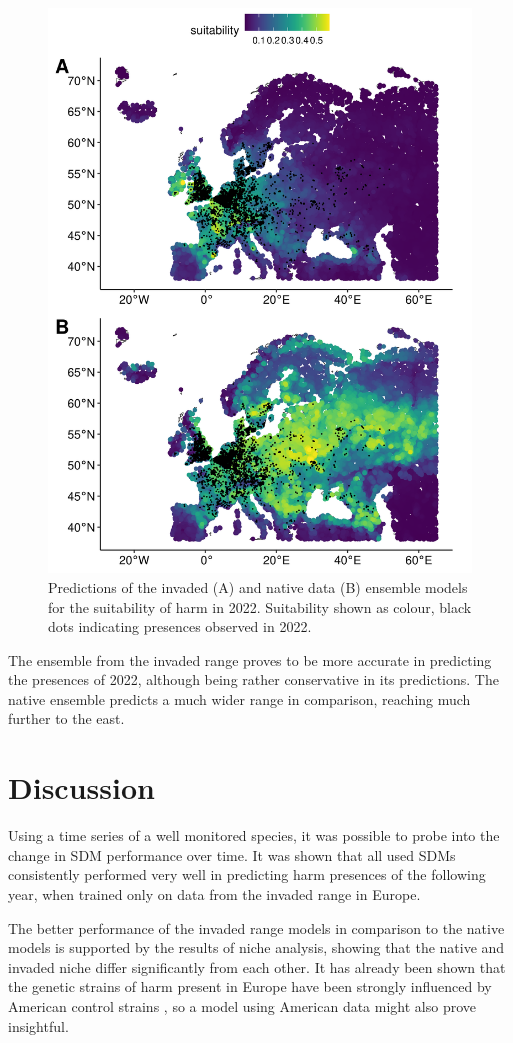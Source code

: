 \documentclass[12pt,a4paper]{article}
\begin{document}
\begin{figure}[H]
    \centering
    \includegraphics[width = 0.71\linewidth]{"../../R/figures/2022-mod-pred.png"}
    \caption{\label{fig:mod_pred} Predictions of the invaded (A) and native data (B) ensemble models for the suitability of \gls{harm} in 2022. Suitability shown as colour, black dots indicating presences observed in 2022.}
\end{figure}

The ensemble from the invaded range proves to be more accurate in predicting the presences of 2022, although being rather conservative in its predictions. The native ensemble predicts a much wider range in comparison, reaching much further to the east.


\newpage
\section{Discussion} \label{sec:discussion}
Using a time series of a well monitored species, it was possible to probe into the change in SDM performance over time.
It was shown that all used SDMs consistently performed very well in predicting \gls{harm} presences of the following year, when trained only on data from the invaded range in Europe.

The better performance of the invaded range models in comparison to the native models is supported by the results of niche analysis, showing that the native and invaded niche differ significantly from each other.
It has already been shown that the genetic strains of \gls{harm} present in Europe have been strongly influenced by American control strains \autocite{lombaert2010harmoniabridgehead}, so a model using American data might also prove insightful.
\end{document}
